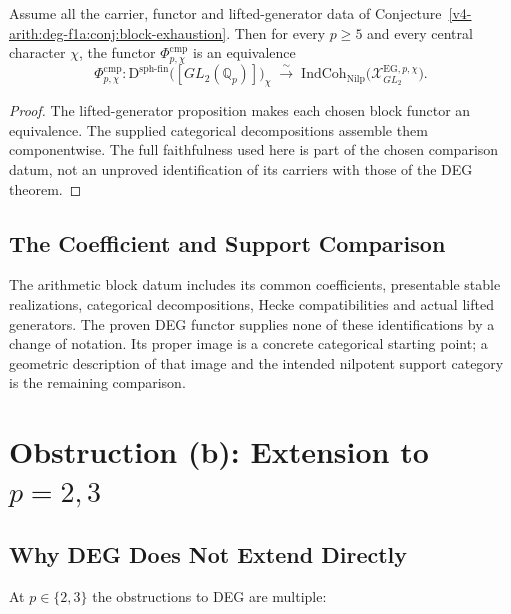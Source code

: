 \begin{theorem}
\label{v4-arith:deg-f1a:thm:ess-surj-conditional}
Assume all the carrier, functor and lifted-generator data of
Conjecture~\ref{v4-arith:deg-f1a:conj:block-exhaustion}. Then for every
\(p\geq 5\) and every central character \(\chi\), the functor
\(\Phi^{\mathrm{cmp}}_{p,\chi}\) is an equivalence
\begin{equation}
\label{v4-arith:deg-f1a:eq:ess-surj-conditional}
\Phi^{\mathrm{cmp}}_{p,\chi}\colon\mathrm{D}^{\mathrm{sph\text{-}fin}}\bigl([GL_{2}(\mathbb{Q}_{p})]\bigr)_{\chi}
\;\xrightarrow{\;\sim\;}\;\mathrm{IndCoh}_{\mathrm{Nilp}}\bigl(\mathcal{X}^{\mathrm{EG},p,\chi}_{GL_{2}}\bigr).
\end{equation}
\end{theorem}

\begin{proof}
The lifted-generator proposition makes each chosen block functor an
equivalence. The supplied categorical decompositions assemble them
componentwise. The full faithfulness used here is part of the chosen
comparison datum, not an unproved identification of its carriers
with those of the DEG theorem.
\end{proof}

\subsection{The Coefficient and Support Comparison}
The arithmetic block datum includes its common coefficients,
presentable stable realizations, categorical decompositions, Hecke
compatibilities and actual lifted generators. The proven DEG
functor supplies none of these identifications by a change of notation.
Its proper image is a concrete categorical starting point; a
geometric description of that image and the intended nilpotent
support category is the remaining comparison.

\section{Obstruction (b): Extension to \(p=2,3\)}
\label{v4-arith:deg-f1a:wild}

\subsection{Why DEG Does Not Extend Directly}

At \(p\in\{2,3\}\) the obstructions to DEG are multiple:

